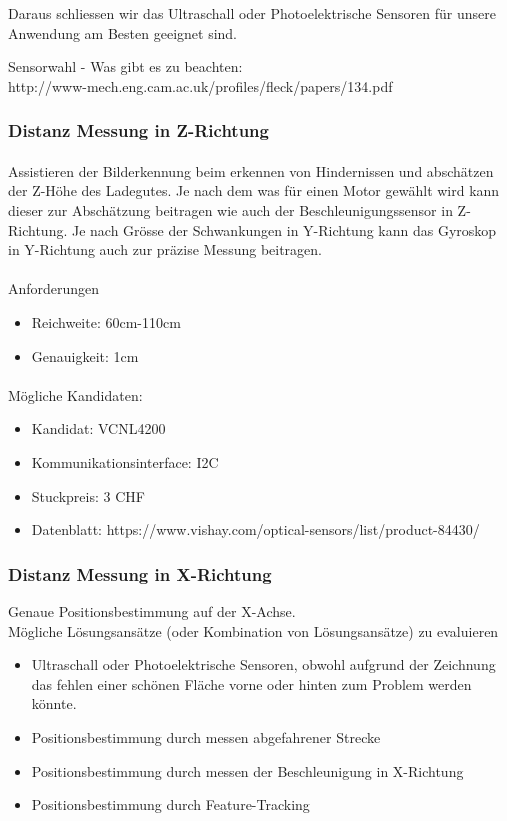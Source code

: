 \documentclass[a4paper]{report}
\begin{document}
Daraus schliessen wir das Ultraschall oder Photoelektrische Sensoren für unsere Anwendung am Besten geeignet sind.

Sensorwahl - Was gibt es zu beachten:\\
http://www-mech.eng.cam.ac.uk/profiles/fleck/papers/134.pdf

\subsubsection{Distanz Messung in Z-Richtung}
\paragraph{} Assistieren der Bilderkennung beim erkennen von Hindernissen und
abschätzen der Z-Höhe des Ladegutes. Je nach dem was für einen Motor gewählt
wird kann dieser zur Abschätzung beitragen wie auch der Beschleunigungssensor
in Z-Richtung. Je nach Grösse der Schwankungen in Y-Richtung kann das Gyroskop
in Y-Richtung auch zur präzise Messung beitragen.

\paragraph{} Anforderungen
\begin{itemize}
\item Reichweite: 60cm-110cm
\item Genauigkeit: 1cm
\end{itemize}

\paragraph{} Mögliche Kandidaten:
\begin{itemize}
\item Kandidat: VCNL4200
\item Kommunikationsinterface: I2C
\item Stuckpreis: 3 CHF
\item Datenblatt: https://www.vishay.com/optical-sensors/list/product-84430/
\end{itemize}

\subsubsection{Distanz Messung in X-Richtung}
Genaue Positionsbestimmung auf der X-Achse.\\
Mögliche Lösungsansätze (oder Kombination von Lösungsansätze) zu
evaluieren
\begin{itemize}
\item Ultraschall oder Photoelektrische Sensoren, obwohl aufgrund der Zeichnung das fehlen einer schönen Fläche vorne oder hinten zum Problem werden könnte.
\item Positionsbestimmung durch messen abgefahrener Strecke
\item Positionsbestimmung durch messen der Beschleunigung in X-Richtung
\item Positionsbestimmung durch Feature-Tracking
\end{itemize}
\end{document}
